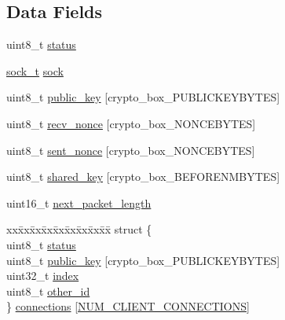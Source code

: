 \subsection*{Data Fields}
\begin{DoxyCompactItemize}
\item 
uint8\+\_\+t \hyperlink{struct_t_c_p___secure___connection_ade818037fd6c985038ff29656089758d}{status}
\item 
\hyperlink{network_8h_ae5faf8a8d23da59c3e3025a62039d8c1}{sock\+\_\+t} \hyperlink{struct_t_c_p___secure___connection_a35b19d84fb632ca8ce5cab237f7089a5}{sock}
\item 
uint8\+\_\+t \hyperlink{struct_t_c_p___secure___connection_aaa806bb1136fb3d4b5d8d8970b596ff7}{public\+\_\+key} \mbox{[}crypto\+\_\+box\+\_\+\+P\+U\+B\+L\+I\+C\+K\+E\+Y\+B\+Y\+T\+E\+S\mbox{]}
\item 
uint8\+\_\+t \hyperlink{struct_t_c_p___secure___connection_aae0467706f97aa3ef23e5dc9c3c199d7}{recv\+\_\+nonce} \mbox{[}crypto\+\_\+box\+\_\+\+N\+O\+N\+C\+E\+B\+Y\+T\+E\+S\mbox{]}
\item 
uint8\+\_\+t \hyperlink{struct_t_c_p___secure___connection_a9df0e00e8f493ed6cd1ff45e7da33c0d}{sent\+\_\+nonce} \mbox{[}crypto\+\_\+box\+\_\+\+N\+O\+N\+C\+E\+B\+Y\+T\+E\+S\mbox{]}
\item 
uint8\+\_\+t \hyperlink{struct_t_c_p___secure___connection_a81ead9fac55a0cedc30a96253a2c5119}{shared\+\_\+key} \mbox{[}crypto\+\_\+box\+\_\+\+B\+E\+F\+O\+R\+E\+N\+M\+B\+Y\+T\+E\+S\mbox{]}
\item 
uint16\+\_\+t \hyperlink{struct_t_c_p___secure___connection_a1d1e3047af3c935db36ae7b2360aaec7}{next\+\_\+packet\+\_\+length}
\item 
\begin{tabbing}
xx\=xx\=xx\=xx\=xx\=xx\=xx\=xx\=xx\=\kill
struct \{\\
\>uint8\_t \hyperlink{struct_t_c_p___secure___connection_ade818037fd6c985038ff29656089758d}{status}\\
\>uint8\_t \hyperlink{struct_t_c_p___secure___connection_aaa806bb1136fb3d4b5d8d8970b596ff7}{public\_key} \mbox{[}crypto\_box\_PUBLICKEYBYTES\mbox{]}\\
\>uint32\_t \hyperlink{struct_t_c_p___secure___connection_aafd95f8c7a99b9189ede7cdf0871ebe8}{index}\\
\>uint8\_t \hyperlink{struct_t_c_p___secure___connection_acc644a8b29d76cc8fb3a5bdfcaa2bfe1}{other\_id}\\
\} \hyperlink{struct_t_c_p___secure___connection_a9238a77824a37f8db533e2fbbf79c4a1}{connections} \mbox{[}\hyperlink{_t_c_p__server_8h_aad3362495a10d80b0edac21c8f896ae1}{NUM\_CLIENT\_CONNECTIONS}\mbox{]}\\


\end{tabbing}
\end{DoxyCompactItemize}
